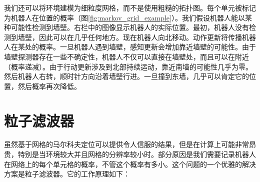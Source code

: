 
我们还可以将环境建模为细粒度网格，而不是使用粗糙的拓扑图。每个单元被标记为机器人在位置的概率（图\ref{fig:markov_grid_example}）。我们假设机器人能以某种可能性检测到墙壁。右栏中的图像显示机器人的实际位置。最初，机器人没有检测到墙壁，因此可以在几乎任何地方。现在机器人向北移动。动作更新将传播机器人在某处的概率。一旦机器人遇到墙壁，感知更新会增加靠近墙壁的可能性。由于墙壁探测器存在一些不确定性，机器人不仅可以直接在墙壁处，而且可以在附近（概率递减）。由于行动更新涉及到北部持续运动，靠近南墙的可能性几乎为零。然后机器人右转，顺时针方向沿着墙壁行进。一旦撞到东墙，几乎可以肯定它的位置，然后概率再次降低。


\section{粒子滤波器}
虽然基于网格的马尔科夫定位可以提供令人信服的结果，但是在计算上可能非常昂贵，特别是当环境较大并且网格的分辨率较小时。部分原因是我们需要记录机器人在网络上的每个单元格的概率，不管这个概率有多小。这个问题的一个优雅的解决方案是粒子滤波器。它的工作原理如下：

